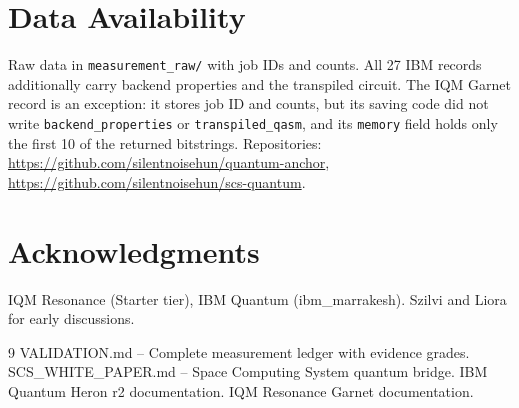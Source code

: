 \documentclass[11pt,a4paper]{article}
\begin{document}
\section{Data Availability}

Raw data in \texttt{measurement\_raw/} with job IDs and counts. All 27 IBM records additionally carry backend properties and the transpiled circuit. The IQM Garnet record is an exception: it stores job ID and counts, but its saving code did not write \texttt{backend\_properties} or \texttt{transpiled\_qasm}, and its \texttt{memory} field holds only the first 10 of the returned bitstrings. Repositories: \url{https://github.com/silentnoisehun/quantum-anchor}, \url{https://github.com/silentnoisehun/scs-quantum}.

\section*{Acknowledgments}

IQM Resonance (Starter tier), IBM Quantum (ibm\_marrakesh). Szilvi and Liora for early discussions.


\begin{thebibliography}{9}
 VALIDATION.md -- Complete measurement ledger with evidence grades.
 SCS\_WHITE\_PAPER.md -- Space Computing System quantum bridge.
 IBM Quantum Heron r2 documentation.
 IQM Resonance Garnet documentation.
\end{thebibliography}
\end{document}
